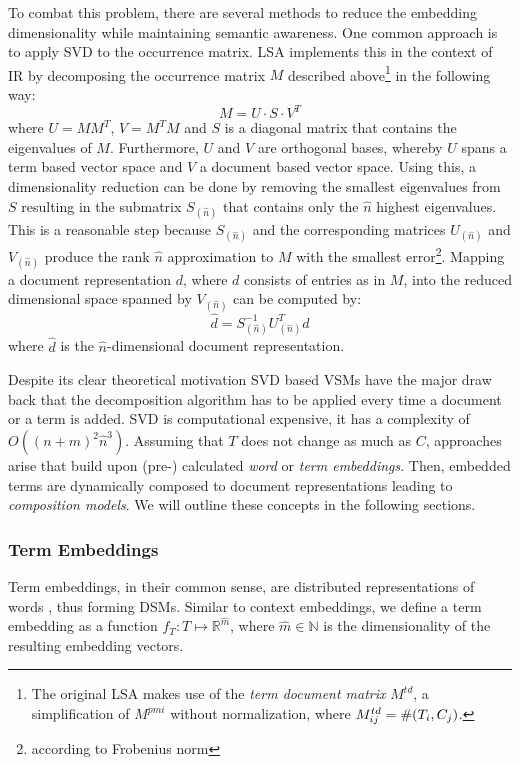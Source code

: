 To combat this problem, there are several methods to reduce the embedding dimensionality while maintaining semantic awareness. One common approach is to apply \ac{SVD} to the occurrence matrix. \ac{LSA} \autocite{deerwester_indexing_1990} implements this in the context of \ac{IR} by decomposing the occurrence matrix $M$ described above\footnote{The original \ac{LSA} makes use of the \textit{term document matrix} $M^{td}$, a simplification of $M^{pmi}$ without normalization, where $M^{td}_{ij} =\nobreak \#(T_i, C_j)$.} in the following way:
\begin{equation}
M = U \cdot S \cdot V^T
\end{equation}
where $U = MM^T$, $V = M^TM$ and $S$ is a diagonal matrix that contains the eigenvalues of $M$. Furthermore, $U$ and $V$ are orthogonal bases, whereby $U$ spans a term based vector space and $V$ a document based vector space. Using this, a dimensionality reduction can be done by removing the smallest eigenvalues from $S$ resulting in the submatrix $S_{(\hat{n})}$ that contains only the $\hat{n}$ highest eigenvalues. This is a reasonable step because $S_{(\hat{n})}$ and the corresponding matrices $U_{(\hat{n})}$ and $V_{(\hat{n})}$ produce the rank $\hat{n}$ approximation to $M$ with the smallest error\footnote{according to Frobenius norm}. Mapping a document representation $d$, where $d$ consists of entries as in $M$, into the reduced dimensional space spanned by $V_{(\hat{n})}$ can be computed by: 
\begin{equation} \label{eq:svd_doc}
\hat{d} = S_{(\hat{n})}^{-1}U_{(\hat{n})}^Td
\end{equation}
where $\hat{d}$ is the $\hat{n}$-dimensional document representation. 

Despite its clear theoretical motivation SVD based VSMs have the major draw back that the decomposition algorithm has to be applied every time a document or a term is added. \ac{SVD} is computational expensive, it has a complexity of $O((n+m)^2\hat{n}^3)$. Assuming that $T$ does not change as much as $C$, approaches arise that build upon (pre-) calculated \textit{word} or \textit{term embeddings}. Then, embedded terms are dynamically composed to document representations leading to \textit{composition models}. We will outline these concepts in the following sections.

\subsubsection{Term Embeddings}
Term embeddings, in their common sense, are distributed representations of words \autocite{bengio_neural_2003}, thus forming \acfp{DSM}. Similar to context embeddings, we define a term embedding as a function $f_T:T \mapsto \mathbb{R}^{\hat{m}}$, where $\hat{m} \in \mathbb{N}$ is the dimensionality of the resulting embedding vectors.

